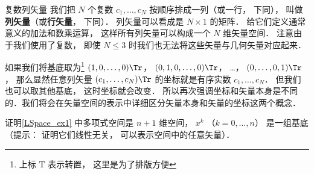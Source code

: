 \begin{exercise}{复数列矢量}
我们把 $N$ 个复数 $c_1, \dots, c_N$ 按顺序排成一列（或一行， 下同）， 叫做\textbf{列矢量}（或\textbf{行矢量}， 下同）． 列矢量可以看成是 $N \times 1$ 的矩阵． 给它们定义通常意义的加法和数乘运算， 这样所有列矢量可以构成一个 $N$ 维矢量空间． 注意由于我们使用了复数， 即使 $N \leqslant 3$ 时我们也无法将这些矢量与几何矢量对应起来．

如果我们将基底取为\footnote{上标 $\mathrm T$ 表示转置， 这里是为了排版方便} $(1, 0, \dots, 0)\Tr$， $(0, 1, 0, \dots, 0)\Tr$， …， $(0, \dots, 0, 1)\Tr$， 那么显然任意列矢量 $(c_1, \dots, c_N)\Tr$ 的坐标就是有序实数 $c_1, \dots, c_N$． 但我们也可以取其他基底， 这时坐标就会改变． 所以再次强调坐标和矢量本身是不同的．我们将会在矢量空间的表示中详细区分矢量本身和矢量的坐标这两个概念．
\end{exercise}

\begin{exercise}{}
证明\autoref{LSpace_ex1} 中多项式空间是 $n+1$ 维空间， $x^k$ （$k = 0, \dots, n$） 是一组基底（提示： 证明它们线性无关， 可以表示空间中的任意矢量）．
\end{exercise}





